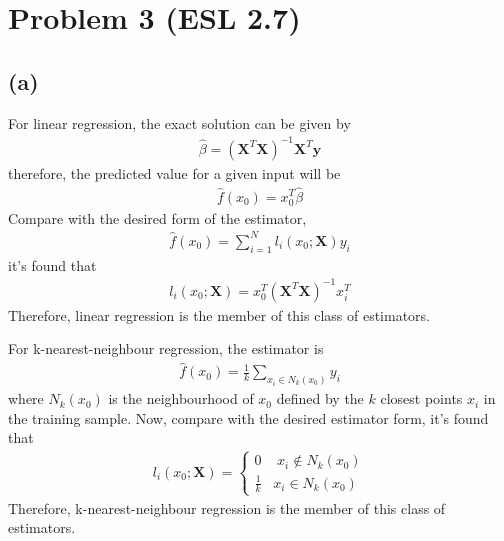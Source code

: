 \documentclass[pra,groupedaddress,amsmath,amssymb, column]{revtex4}
\begin{document}
\section*{Problem 3 (ESL 2.7)}
\subsection*{(a)}
For linear regression, the exact solution can be given by
\begin{align}
\hat{\beta} = (\mathbf{X}^T\mathbf{X})^{-1}\mathbf{X}^T\mathbf{y}
\end{align}
therefore, the predicted value for a given input will be
\begin{align}
\hat{f}(x_0) = x_0^T\hat{\beta}
\end{align}
Compare with the desired form of the estimator,
\begin{align}
\hat{f}(x_0) =\sum_{i=1}^{N}l_i(x_0; \mathbf{X})y_i \label{3a}
\end{align}
it's found that
\begin{align}
l_i(x_0; \mathbf{X}) = x_0^T(\mathbf{X}^T\mathbf{X})^{-1}x_i^T
\end{align}
Therefore, linear regression is the member of this class of estimators. 

For k-nearest-neighbour regression, the estimator is 
\begin{align}
\hat{f}(x_0) = \frac{1}{k}\sum_{x_i\in N_k(x_0)}y_i
\end{align}
where $N_k(x_0)$ is the neighbourhood of $x_0$ defined by the $k$ closest points $x_i$ in the training sample. Now, compare with the desired estimator form, it's found that
\begin{align}
l_i(x_0; \mathbf{X}) =\left\{ 
\begin{array}{l}
0\;\;\;\;\text{$x_i \not\in N_k(x_0)$} \\
\frac{1}{k}\;\;\;\text{$x_i\in N_k(x_0)$}
 \end{array}\right.
\end{align}
Therefore,  k-nearest-neighbour regression is the member of this class of estimators. 
\end{document}
